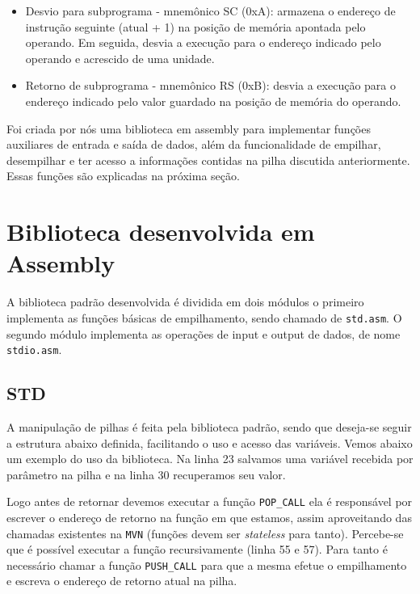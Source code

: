 \begin{itemize}
	\item Desvio para subprograma - mnemônico SC (0xA): armazena o endereço de instrução seguinte (atual + 1) na posição de memória apontada pelo operando. Em seguida, desvia a execução para o endereço indicado pelo operando e acrescido de uma unidade.
	
	\item Retorno de subprograma - mnemônico RS (0xB): desvia a execução para o endereço indicado pelo valor guardado na posição de memória do operando.
\end{itemize}

Foi criada por nós uma biblioteca em assembly para implementar funções auxiliares de entrada e saída de dados, além da funcionalidade de empilhar, desempilhar e ter acesso a informações contidas na pilha discutida anteriormente. Essas funções são explicadas na próxima seção.

\section{Biblioteca desenvolvida em Assembly}

A biblioteca padrão desenvolvida é dividida em dois módulos o primeiro
implementa as funções básicas de empilhamento, sendo chamado de \verb!std.asm!.
O segundo módulo implementa as operações de input e output de dados, de nome 
\verb!stdio.asm!.

\subsection{STD}

A manipulação de pilhas é feita pela biblioteca padrão, sendo que deseja-se
seguir a estrutura abaixo definida, facilitando o uso e acesso das variáveis.
Vemos abaixo um exemplo do uso da biblioteca. Na linha 23 salvamos uma variável
recebida por parâmetro na pilha e na linha 30 recuperamos seu valor. 

Logo antes de retornar devemos executar a função \verb!POP_CALL! 
ela é responsável por
escrever o endereço de retorno na função em que estamos, assim aproveitando das
chamadas existentes na \verb!MVN! (funções devem ser \emph{stateless} para tanto). Percebe-se
que é possível executar a função recursivamente (linha 55 e 57). Para tanto é
necessário chamar a função \verb!PUSH_CALL! para que a mesma efetue o
empilhamento e escreva o endereço de retorno atual na pilha. 

